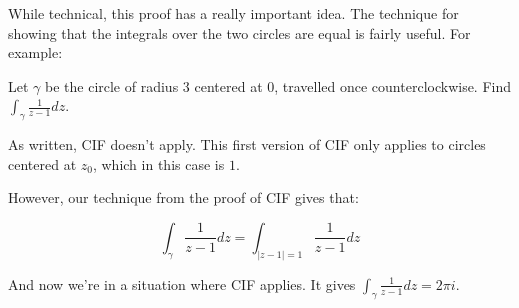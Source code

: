 While technical, this proof has a really important idea. The technique for showing that the integrals over the two circles are equal is fairly useful. For example:

\begin{ex}{}{}Let $\gamma$ be the circle of radius $3$ centered at $0$, travelled once counterclockwise. Find $\int_{\gamma} \frac{1}{z-1}dz$.

As written, CIF doesn't apply. This first version of CIF only applies to circles centered at $z_0$, which in this case is $1$.

However, our technique from the proof of CIF gives that:

$$\int_{\gamma} \frac{1}{z-1}dz = \int_{|z-1|=1} \frac{1}{z-1}dz$$

And now we're in a situation where CIF applies. It gives $\int_{\gamma} \frac{1}{z-1}dz = 2\pi i$.\end{ex}